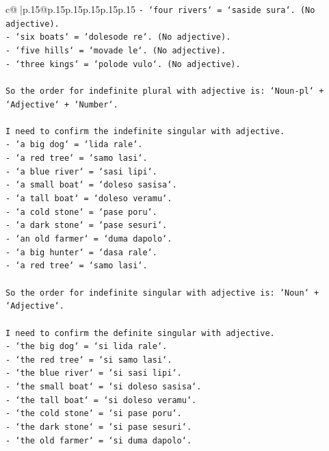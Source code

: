 \documentclass{article}
\begin{document}
{\begin{supertabular}{c@{$\;$}|p{.15\linewidth}@{}p{.15\linewidth}p{.15\linewidth}p{.15\linewidth}p{.15\linewidth}p{.15\linewidth}}
{{{\texttt{{-} `four rivers` = `saside sura`. (No adjective).} \\
\texttt{{-} `six boats` = `dolesode re`. (No adjective).} \\
\texttt{{-} `five hills` = `movade le`. (No adjective).} \\
\texttt{{-} `three kings` = `polode vulo`. (No adjective).} \\
\\ 
\texttt{So the order for indefinite plural with adjective is: `Noun{-}pl` + `Adjective` + `Number`.} \\
\\ 
\texttt{I need to confirm the indefinite singular with adjective.} \\
\texttt{{-} `a big dog` = `lida rale`.} \\
\texttt{{-} `a red tree` = `samo lasi`.} \\
\texttt{{-} `a blue river` = `sasi lipi`.} \\
\texttt{{-} `a small boat` = `doleso sasisa`.} \\
\texttt{{-} `a tall boat` = `doleso veramu`.} \\
\texttt{{-} `a cold stone` = `pase poru`.} \\
\texttt{{-} `a dark stone` = `pase sesuri`.} \\
\texttt{{-} `an old farmer` = `duma dapolo`.} \\
\texttt{{-} `a big hunter` = `dasa rale`.} \\
\texttt{{-} `a red tree` = `samo lasi`.} \\
\\ 
\texttt{So the order for indefinite singular with adjective is: `Noun` + `Adjective`.} \\
\\ 
\texttt{I need to confirm the definite singular with adjective.} \\
\texttt{{-} `the big dog` = `si lida rale`.} \\
\texttt{{-} `the red tree` = `si samo lasi`.} \\
\texttt{{-} `the blue river` = `si sasi lipi`.} \\
\texttt{{-} `the small boat` = `si doleso sasisa`.} \\
\texttt{{-} `the tall boat` = `si doleso veramu`.} \\
\texttt{{-} `the cold stone` = `si pase poru`.} \\
\texttt{{-} `the dark stone` = `si pase sesuri`.} \\
\texttt{{-} `the old farmer` = `si duma dapolo`.} \\
}}}
\end{supertabular}}
\end{document}
